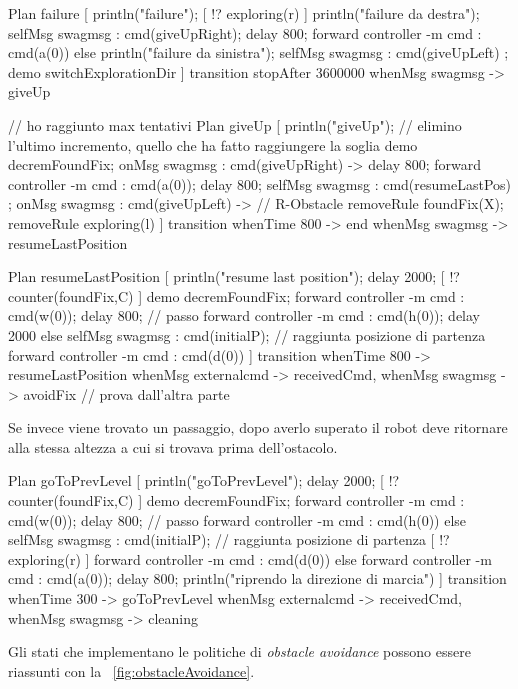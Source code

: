\documentclass{../llncs}
\newcommand{\xf}[1]{\figurename~\ref{fig:#1}}
\begin{document}
\begin{qacode}[caption={SoftwareAgent, pt9}]
Plan failure [
	println("failure");
	[ !? exploring(r) ] {
		println("failure da destra");
		selfMsg swagmsg : cmd(giveUpRight);
		delay 800;
		forward controller -m cmd : cmd(a(0))
	}
	else {
		println("failure da sinistra");
		selfMsg swagmsg : cmd(giveUpLeft)
	};
	demo switchExplorationDir
]
transition stopAfter 3600000
	whenMsg swagmsg -> giveUp

// ho raggiunto max tentativi
Plan giveUp [
	println("giveUp");
	// elimino l'ultimo incremento, quello che ha fatto raggiungere la soglia
	demo decremFoundFix;
	onMsg swagmsg : cmd(giveUpRight) -> {
		delay 800;
		forward controller -m cmd : cmd(a(0));
		delay 800;
		selfMsg swagmsg : cmd(resumeLastPos)
	};
	onMsg swagmsg : cmd(giveUpLeft) -> { // R-Obstacle
		removeRule foundFix(X);
		removeRule exploring(l)
	}
]
transition
	whenTime 800 -> end
	whenMsg swagmsg -> resumeLastPosition
	
Plan resumeLastPosition [
	println("resume last position");
	delay 2000;
	[ !? counter(foundFix,C) ] {
		demo decremFoundFix;
		forward controller -m cmd : cmd(w(0));
		delay 800; // passo
		forward controller -m cmd : cmd(h(0));
		delay 2000
	}
	else {
		selfMsg swagmsg : cmd(initialP); // raggiunta posizione di partenza
		forward controller -m cmd : cmd(d(0))
	}
]
transition
	whenTime 800 -> resumeLastPosition
	whenMsg externalcmd -> receivedCmd,
	whenMsg swagmsg -> avoidFix // prova dall'altra parte
\end{qacode}

Se invece viene trovato un passaggio, dopo averlo superato il robot deve ritornare alla stessa altezza a cui si trovava prima dell'ostacolo.\\

\begin{qacode}[caption={SoftwareAgent, pt10}]
Plan goToPrevLevel [
	println("goToPrevLevel");
	delay 2000;
	[ !? counter(foundFix,C) ] {
		demo decremFoundFix;
		forward controller -m cmd : cmd(w(0));
		delay 800; // passo
		forward controller -m cmd : cmd(h(0))
	}
	else {
		selfMsg swagmsg : cmd(initialP); // raggiunta posizione di partenza
		[ !? exploring(r) ] forward controller -m cmd : cmd(d(0))
		else forward controller -m cmd : cmd(a(0));
		delay 800;
		println("riprendo la direzione di marcia")
	}
]
transition
	whenTime 300 -> goToPrevLevel
	whenMsg externalcmd -> receivedCmd,
	whenMsg swagmsg -> cleaning
\end{qacode}

Gli stati che implementano le politiche di \emph{obstacle avoidance} possono essere riassunti con la \xf{obstacleAvoidance}.
\end{document}
